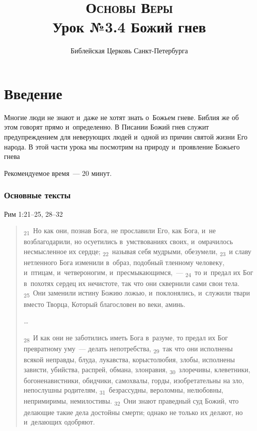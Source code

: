 \documentclass[a4paper,12pt]{article}
\title{\textsc{Основы Веры}\\Урок №3.4 Божий гнев}
\author{Библейская Церковь Санкт-Петербурга}
\date{}
\begin{document}
\maketitle

\thispagestyle{empty}

\tableofcontents



\section{Введение}

Многие люди не знают и~даже не хотят знать о~Божьем гневе. Библия же об этом говорят прямо и~определенно. В Писании Божий гнев служит предупреждением для неверующих людей и~одной из причин святой жизни Его народа. В этой части урока мы посмотрим на природу и~проявление Божьего гнева

Рекомендуемое время~--- 20 минут.
        
\subsubsection*{Основные тексты}

Рим 1:21--25, 28--32

\begin{quote}
\textsubscript{21}~Но как они, познав Бога, не прославили Его, как Бога, и~не возблагодарили, но осуетились в~умствованиях своих, и~омрачилось несмысленное их сердце; 
\textsubscript{22}~называя себя мудрыми, обезумели, 
\textsubscript{23}~и славу нетленного Бога изменили в~образ, подобный тленному человеку, и~птицам, и~четвероногим, и~пресмыкающимся,~--- 
\textsubscript{24}~то и~предал их Бог в~похотях сердец их нечистоте, так что они сквернили сами свои тела. 
\textsubscript{25}~Они заменили истину Божию ложью, и~поклонялись, и~служили твари вместо Творца, Который благословен во веки, аминь. 

\ldots

\textsubscript{28}~И как они не заботились иметь Бога в~разуме, то предал их Бог превратному уму~--- делать непотребства, 
\textsubscript{29}~так что они исполнены всякой неправды, блуда, лукавства, корыстолюбия, злобы, исполнены зависти, убийства, распрей, обмана, злонравия, 
\textsubscript{30}~злоречивы, клеветники, богоненавистники, обидчики, самохвалы, горды, изобретательны на зло, непослушны родителям, 
\textsubscript{31}~безрассудны, вероломны, нелюбовны, непримиримы, немилостивы. 
\textsubscript{32}~Они знают праведный суд Божий, что делающие такие дела достойны смерти; однако не только их делают, но и~делающих одобряют. 
\end{quote}
\end{document}
